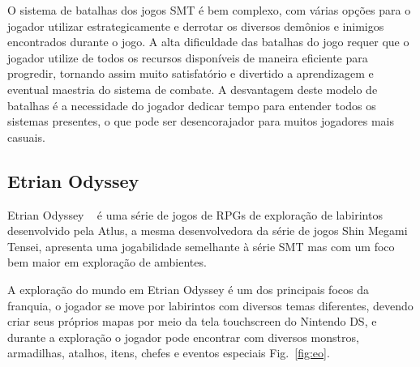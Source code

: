 O sistema de batalhas dos jogos SMT é bem complexo, com várias opções para o jogador utilizar estrategicamente e derrotar os diversos demônios e inimigos encontrados durante o jogo. A alta dificuldade das batalhas do jogo requer que o jogador utilize de todos os recursos disponíveis de maneira eficiente para progredir, tornando assim muito satisfatório e divertido a aprendizagem e eventual maestria do sistema de combate. A desvantagem deste modelo de batalhas é a necessidade do jogador dedicar tempo para entender todos os sistemas presentes, o que pode ser desencorajador para muitos jogadores mais casuais.

\subsection{Etrian Odyssey}

Etrian Odyssey ~\cite{EOW} é uma série de jogos de RPGs de exploração de labirintos desenvolvido pela Atlus, a mesma desenvolvedora da série de jogos Shin Megami Tensei, apresenta uma jogabilidade semelhante à série SMT mas com um foco bem maior em exploração de ambientes.

	A exploração do mundo em Etrian Odyssey é um dos principais focos da franquia, o jogador se move por labirintos com diversos temas diferentes, devendo criar seus próprios mapas por meio da tela touchscreen do Nintendo DS, e durante a exploração o jogador pode encontrar com diversos monstros, armadilhas, atalhos, itens, chefes e eventos especiais Fig.~\ref{fig:eo}.

